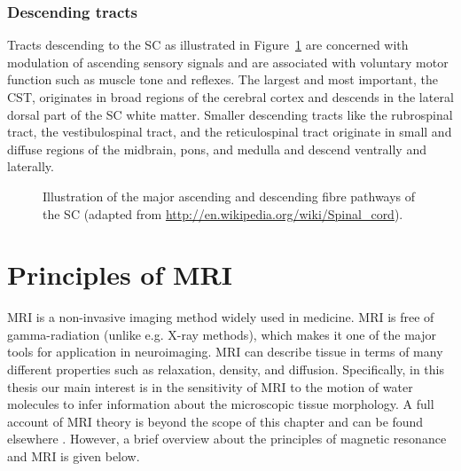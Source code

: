 \subsubsection{Descending tracts}
\label{sec:chap2:descendingtracts}
Tracts descending to the {\gls{SC}} as illustrated in Figure~\ref{fig:chapter 2 spinal_cord_anatomy} are concerned with modulation of ascending sensory signals and are associated with voluntary motor function such as muscle tone and reflexes. The largest and most important, the {\gls{CST}}, originates in broad regions of the cerebral cortex and descends in the lateral dorsal part of the {\gls{SC}} white matter. Smaller descending tracts like the rubrospinal tract, the vestibulospinal tract, and the reticulospinal tract originate in small and diffuse regions of the midbrain, pons, and medulla and descend ventrally and laterally.
\begin{figure}
 \centering
  \caption{Illustration of the major ascending and descending fibre pathways of the {\protect\gls{SC}} (adapted from \url{http://en.wikipedia.org/wiki/Spinal_cord}).}
  \label{fig:chapter 2 spinal_cord_anatomy}
\end{figure}

\section{Principles of MRI}
\Gls{MRI} is a non-invasive imaging method widely used in medicine. \gls{MRI} is free of gamma-radiation (unlike e.g. X-ray methods), which makes it one of the major tools for application in neuroimaging. \Gls{MRI} can describe tissue in terms of many different properties such as relaxation, density, and diffusion. Specifically, in this thesis our main interest is in the sensitivity of MRI to the motion of water molecules to infer information about the microscopic tissue morphology. A full account of \gls{MRI} theory is beyond the scope of this chapter and can be found elsewhere \citep{McRobbie:2002,Bernstein:2004}. However, a brief overview about the principles of magnetic resonance and \gls{MRI} is given below.


